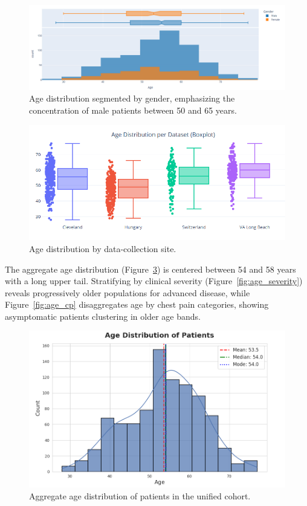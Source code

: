 \documentclass[12pt]{article}
\begin{document}
\begin{figure}[t]
  \centering
  \includegraphics[width=0.85\linewidth]{age_distribution_by_gender.png}
  \caption{Age distribution segmented by gender, emphasizing the concentration of male patients between 50 and 65 years.}
  \label{fig:age_gender}
\end{figure}

\begin{figure}[t]
  \centering
  \includegraphics[width=0.85\linewidth]{age_distribution_by_dataset_site.png}
  \caption{Age distribution by data-collection site.}
  \label{fig:site}
\end{figure}

The aggregate age distribution (Figure~\ref{fig:age_overall}) is centered between 54 and 58 years with a long upper tail. Stratifying by clinical severity (Figure~\ref{fig:age_severity}) reveals progressively older populations for advanced disease, while Figure~\ref{fig:age_cp} disaggregates age by chest pain categories, showing asymptomatic patients clustering in older age bands.

\begin{figure}[t]
  \centering
  \includegraphics[width=0.85\linewidth]{age_distribution_of_patients.png}
  \caption{Aggregate age distribution of patients in the unified cohort.}
  \label{fig:age_overall}
\end{figure}
\end{document}

